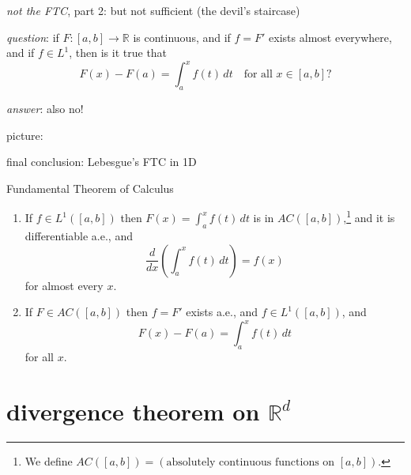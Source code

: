 \documentclass[10pt,
               svgnames,
               hyperref={colorlinks,
                         citecolor=DeepPink4,
                         linkcolor=FireBrick,
                         urlcolor=blue},
               usepdftitle=false]{beamer}
\newcommand{\RR}{\mathbb{R}}
\begin{document}
\begin{frame}{\emph{not the FTC}, part 2: but not sufficient (the devil's staircase)}

\medskip \noindent \emph{question}: if $F:[a,b]\to\RR$ is continuous, and if $f=F'$ exists almost everywhere, and if $f\in L^1$, then is it true that
    $$F(x) -F(a)= \int_a^x f(t)\,dt \quad \text{for all } x\in [a,b]?$$

\medskip \noindent \emph{answer}: also \alert{no}!

\bigskip
\noindent picture:

\vspace{50mm}
\end{frame}


\begin{frame}{final conclusion: Lebesgue's FTC in 1D}

\begin{block}{Fundamental Theorem of Calculus}
\begin{enumerate}
\item If $f \in L^1([a,b])$ then $F(x) = \int_a^x f(t)\,dt$ is in $AC([a,b])$,\footnote{We define $AC([a,b])=(\text{absolutely continuous functions on } [a,b])$.} and it is differentiable a.e., and
    $$\frac{d}{dx}\left(\int_a^x f(t)\,dt\right) = f(x)$$
for almost every $x$.
\item If $F \in AC([a,b])$ then $f=F'$ exists a.e., and $f\in L^1([a,b])$, and
    $$F(x)-F(a) = \int_a^x f(t)\,dt$$
for all $x$.
\end{enumerate}
\end{block}


\end{frame}


\AtBeginSection[] {
    \begin{frame}{Outline}
    \setbeamertemplate{section in toc}[sections numbered]
    \tableofcontents[currentsection]%
    \end{frame}
}


\section{divergence theorem on $\RR^d$}
\end{document}
